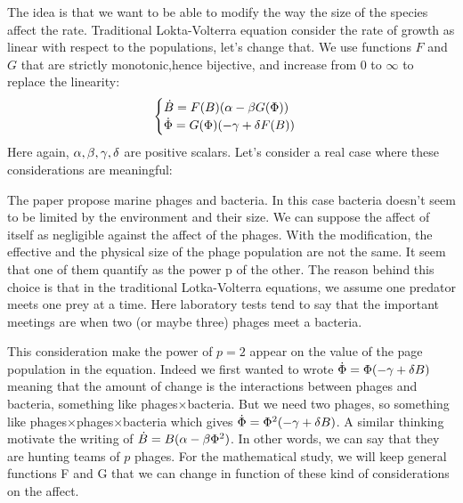 The idea is that we want to be able to modify the way the size of the species affect the rate. Traditional Lokta-Volterra equation consider the rate of growth as linear with respect to the populations, let's change that. We use functions $F$ and $G$ that are strictly monotonic,hence bijective, and increase from $0$ to $\infty$ to replace the linearity:
\begin{equation} \label{eq:LV}
    \begin{cases}
    \dot{B} = F(B)(\alpha -\beta G(\Phi)) \\
    \dot{\Phi} = G(\Phi)(-\gamma +\delta F(B))
    \end{cases}
\end{equation}
Here again, $\alpha,\beta,\gamma,\delta$ are positive scalars.
Let's consider a real case where these considerations are meaningful:

The paper \cite{Gav} propose marine phages and bacteria. In this case bacteria doesn't seem to be limited by the environment and their size. We can suppose the affect of itself as negligible against the affect of the phages. With the modification, the effective and the physical size of the phage population are not the same. It seem that one of them quantify as the power p of the other. The reason behind this choice is that in the traditional Lotka-Volterra equations, we assume one predator meets one prey at a time. Here laboratory tests tend to say that the important meetings are when two (or maybe three) phages meet a bacteria.

This consideration make the power of $p=2$ appear on the value of the page population in the equation. Indeed we first wanted to wrote $\dot{\Phi}=\Phi(-\gamma+\delta B)$ meaning that the amount of change is the interactions between phages and bacteria, something like phages$\times$bacteria. But we need two phages, so something like phages$\times$phages$\times$bacteria which gives $\dot{\Phi}=\Phi^2(-\gamma+\delta B)$. A similar thinking motivate the writing of $\dot{B}=B(\alpha-\beta \Phi^2)$. In other words, we can say that they are hunting  teams of $p$ phages. For the mathematical study, we will keep general functions F and G that we can change in function of these kind of considerations on the affect.

